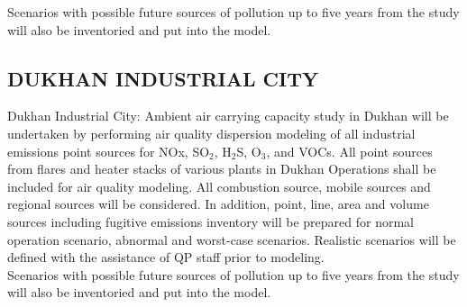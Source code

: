 Scenarios with possible future sources of pollution up to five years from the study will also be inventoried and put into the model.

\subsection{DUKHAN INDUSTRIAL CITY}
Dukhan Industrial City: Ambient air carrying capacity study in Dukhan will be undertaken by performing air quality dispersion modeling of all industrial emissions point sources for NOx, SO$_{2}$, H$_{2}$S, O$_{3}$, and VOCs. All point sources from flares and heater stacks of various plants in Dukhan Operations shall be included for air quality modeling.  All combustion source, mobile sources and regional sources will be considered. In addition, point, line, area and volume sources including fugitive emissions inventory will be prepared for normal operation scenario, abnormal and worst-case scenarios. Realistic scenarios will be defined with the assistance of QP staff prior to modeling.\\

Scenarios with possible future sources of pollution up to five years from the study will also be inventoried and put into the model.



